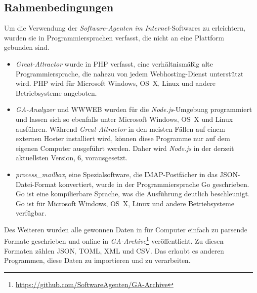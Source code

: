 \subsection{Rahmenbedingungen}
\label{sub:forschung_rahmenbedingungen}

Um die Verwendung der \emph{Software-Agenten im Internet}-Softwares zu
erleichtern, wurden sie in Programmiersprachen verfasst, die nicht an eine
Plattform gebunden sind.

\begin{itemize}
\item
  \emph{Great-Attractor} wurde in PHP verfasst, eine verhältnismäßig alte
  Programmiersprache, die nahezu von jedem Webhosting-Dienst unterstützt wird.
  PHP wird für Microsoft Windows, OS~X, Linux und andere Betriebsysteme
  angeboten.
\item
  \emph{GA-Analyzer} und WWWEB wurden für die \emph{Node.js}-Umgebung
  programmiert und lassen sich so ebenfalls unter Microsoft Windows, OS~X und
  Linux ausführen. Während \emph{Great-Attractor} in den meisten Fällen auf
  einem externen Hoster installiert wird, können diese Programme nur auf dem
  eigenen Computer ausgeführt werden. Daher wird \emph{Node.js} in der derzeit
  aktuellsten Version, 6, vorausgesetzt.
\item
  \emph{process\_mailbox}, eine Spezialsoftware, die IMAP-Postfächer in das
  JSON-Datei-Format konvertiert, wurde in der Programmiersprache Go
  geschrieben. Go ist eine kompilierbare Sprache, was die Ausführung deutlich
  beschleunigt. Go ist für Microsoft Windows, OS~X, Linux und andere
  Betriebsysteme verfügbar.
\end{itemize}

Des Weiteren wurden alle gewonnen Daten in für Computer einfach zu parsende
Formate geschrieben und online in
\emph{GA-Archive}\footnote{\url{https://github.com/SoftwareAgenten/GA-Archive}}
veröffentlicht. Zu diesen Formaten zählen JSON, TOML, XML und CSV. Das erlaubt
es anderen Programmen, diese Daten zu importieren und zu verarbeiten.
